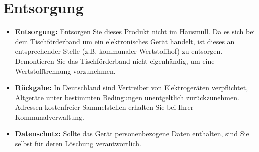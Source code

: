 \section{Entsorgung}
\begin{itemize}
	\item \textbf {Entsorgung:} 
	Entsorgen Sie dieses Produkt nicht im Hausmüll. Da es sich bei dem Tischförderband um ein elektronisches Gerät handelt, ist dieses an entsprechender Stelle (z.B. kommunaler Wertstoffhof) zu entsorgen. Demontieren Sie das Tischförderband nicht eigenhändig, um eine Wertstofftrennung vorzunehmen.
	\item \textbf {Rückgabe:}
	In Deutschland sind Vertreiber von Elektrogeräten verpflichtet, Altgeräte unter bestimmten Bedingungen unentgeltlich zurückzunehmen. Adressen kostenfreier Sammelstellen erhalten Sie bei Ihrer Kommunalverwaltung.
	\item \textbf {Datenschutz:}
	Sollte das Gerät personenbezogene Daten enthalten, sind Sie selbst für deren Löschung verantwortlich.
\end{itemize}